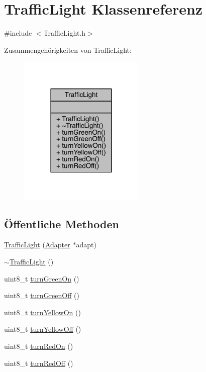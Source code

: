 \hypertarget{class_traffic_light}{}\section{Traffic\+Light Klassenreferenz}
\label{class_traffic_light}


{\ttfamily \#include $<$Traffic\+Light.\+h$>$}



Zusammengehörigkeiten von Traffic\+Light\+:
\nopagebreak
\begin{figure}[H]
\begin{center}
\leavevmode
\includegraphics[width=170pt]{class_traffic_light__coll__graph}
\end{center}
\end{figure}
\subsection*{Öffentliche Methoden}
\begin{DoxyCompactItemize}
\item 
\hyperlink{class_traffic_light_ac34af2ea06577584a1c30a4f40e2d521}{Traffic\+Light} (\hyperlink{class_adapter}{Adapter} $\ast$adapt)
\item 
\hyperlink{class_traffic_light_a3dd2a89a028c1586ced0ab587dda8cc1}{$\sim$\+Traffic\+Light} ()
\item 
uint8\+\_\+t \hyperlink{class_traffic_light_a9477c1e61facd79e308b297877e3beee}{turn\+Green\+On} ()
\item 
uint8\+\_\+t \hyperlink{class_traffic_light_a958814eefaf288da1e103bf32c5c38b9}{turn\+Green\+Off} ()
\item 
uint8\+\_\+t \hyperlink{class_traffic_light_a74b400dafd029a2cfde6c27434111d21}{turn\+Yellow\+On} ()
\item 
uint8\+\_\+t \hyperlink{class_traffic_light_a17723c3478b4eb754aa8b163234aa8be}{turn\+Yellow\+Off} ()
\item 
uint8\+\_\+t \hyperlink{class_traffic_light_acd3d36d6884744b2230bd234bff27357}{turn\+Red\+On} ()
\item 
uint8\+\_\+t \hyperlink{class_traffic_light_a2ca2808ea156abc199a14939c2ab0c92}{turn\+Red\+Off} ()
\end{DoxyCompactItemize}


